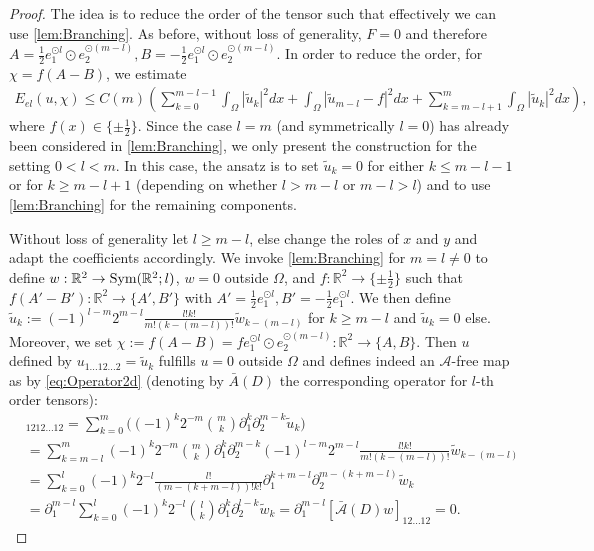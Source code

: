 \documentclass[a4paper, 10pt, twoside, notitlepage]{amsart}
\theoremstyle{plain}
\newcommand{\R}{\mathbb{R}}
\newcommand{\p}{\partial}
\newcommand{\A}{\mathcal{A}}
\begin{document}
		\begin{proof}
			The idea is to reduce the order of the tensor such that effectively we can use \cref{lem:Branching}.  As before, without loss of generality, $F = 0$ and therefore
			$A = \frac{1}{2} e_1^{\odot l} \odot e_2^{\odot(m-l)}, B = -\frac{1}{2} e_1^{\odot l} \odot e_2^{\odot (m-l)}$.  In order to reduce the order, for  $\chi = f (A-B)$, we estimate
			\begin{align*}
				E_{el}(u,\chi) \leq C(m) \left( \sum_{k=0}^{m-l-1} \int_\Omega |\tilde{u}_k|^2 dx + \int_\Omega |\tilde{u}_{m-l} - f|^2 dx + \sum_{k=m-l+1}^m \int_\Omega |\tilde{u}_k|^2 dx \right),
			\end{align*}
			where $f(x) \in \{\pm \frac{1}{2}\}$. Since the case $l=m$ (and symmetrically $l=0$) has already been considered in \cref{lem:Branching}, we only present the construction for the setting $0<l<m$. In this case, the ansatz is to set $\tilde{u}_k = 0$ for either $k \leq m-l-1$ or for $k \geq m-l+1$ (depending on whether $l>m-l$ or $m-l>l$) and to use \cref{lem:Branching} for the remaining components.   

                        \smallskip 
                                               Without loss of generality let $l \geq m-l$, else change the roles of $x$ and $y$ and adapt the coefficients accordingly.
                        We invoke \cref{lem:Branching} for $m = l \neq 0$ to define $w: \R^2 \to \textup{Sym}(\R^2;l)$, $w = 0$ outside $\Omega$, and $f: \R^2 \to \{\pm \frac{1}{2}\}$ such that
			$f (A'-B'): \R^2 \to \{A',B'\}$ with $A'= \frac{1}{2} e_1^{\odot l},B' = -\frac{1}{2} e_1^{\odot l}$. 
			We then define
			$\tilde{u}_k := (-1)^{l-m} 2^{m-l} \frac{l!k!}{m!(k-(m-l))!} \tilde{w}_{k-(m-l)}$ for $k \geq m-l$ and $\tilde{u}_k=0$ else. 
                        Moreover, we set $\chi := f (A-B) = f e_1^{\odot l} \odot e_2^{\odot (m-l)}: \R^2 \to \{A,B\}$.  Then $u$ defined by $u_{1\dots12\dots2} = \tilde{u}_k$ fulfills $u=0$ outside $\Omega$ and defines indeed an $\A$-free map as by \cref{eq:Operator2d} (denoting by $\bar{A}(D)$ the corresponding operator for $l$-th order tensors):
			\begin{align*}
				[\A(D)u]&_{1212\dots12} = \sum_{k=0}^m \Big( (-1)^k 2^{-m} \binom{m}{k} \p_1^k \p_2^{m-k} \tilde{u}_k \Big) \\
				& = \sum_{k=m-l}^m (-1)^k 2^{-m} \binom{m}{k} \p_1^k \p_2^{m-k}(-1)^{l-m} 2^{m-l} \frac{l!k!}{m!(k-(m-l))!} \tilde{w}_{k-(m-l)} \\
                                & = \sum_{k=0}^l (-1)^k 2^{-l}\frac{l!}{(m-(k+m-l))!k!}\p_1^{k+m-l} \p_2^{m-(k+m-l)} \tilde{w}_{k} \\
				& = \p_1^{m-l} \sum_{k=0}^l (-1)^k 2^{-l} \binom{l}{k} \p_1^k \p_2^{l-k} \tilde{w}_k = \p_1^{m-l} [\bar{\A}(D)w]_{12\dots12} = 0.
			\end{align*} 
		

\end{proof}
\end{document}
